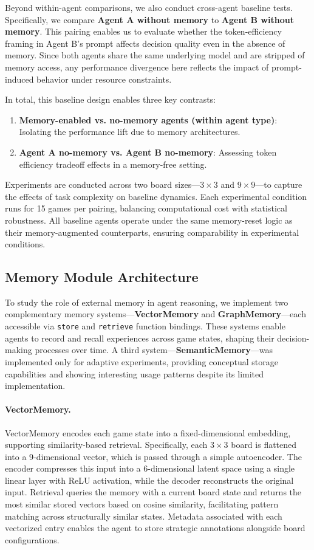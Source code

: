 \documentclass[10pt]{article}
\begin{document}
Beyond within-agent comparisons, we also conduct cross-agent baseline tests. Specifically, we compare \textbf{Agent A without memory} to \textbf{Agent B without memory}. This pairing enables us to evaluate whether the token-efficiency framing in Agent B's prompt affects decision quality even in the absence of memory. Since both agents share the same underlying model and are stripped of memory access, any performance divergence here reflects the impact of prompt-induced behavior under resource constraints.

In total, this baseline design enables three key contrasts:
\begin{enumerate}[leftmargin=*,nosep]
    \item \textbf{Memory-enabled vs. no-memory agents (within agent type)}: Isolating the performance lift due to memory architectures.
    \item \textbf{Agent A no-memory vs. Agent B no-memory}: Assessing token efficiency tradeoff effects in a memory-free setting.
\end{enumerate}

Experiments are conducted across two board sizes—$3 \times 3$ and $9 \times 9$—to capture the effects of task complexity on baseline dynamics. Each experimental condition runs for 15 games per pairing, balancing computational cost with statistical robustness. All baseline agents operate under the same memory-reset logic as their memory-augmented counterparts, ensuring comparability in experimental conditions.

\subsection{Memory Module Architecture}

To study the role of external memory in agent reasoning, we implement two complementary memory systems—\textbf{VectorMemory} and \textbf{GraphMemory}—each accessible via \verb|store| and \verb|retrieve| function bindings. These systems enable agents to record and recall experiences across game states, shaping their decision-making processes over time. A third system—\textbf{SemanticMemory}—was implemented only for adaptive experiments, providing conceptual storage capabilities and showing interesting usage patterns despite its limited implementation.

\paragraph{VectorMemory.} 
VectorMemory encodes each game state into a fixed-dimensional embedding, supporting similarity-based retrieval. Specifically, each $3 \times 3$ board is flattened into a 9-dimensional vector, which is passed through a simple autoencoder. The encoder compresses this input into a 6-dimensional latent space using a single linear layer with ReLU activation, while the decoder reconstructs the original input. Retrieval queries the memory with a current board state and returns the most similar stored vectors based on cosine similarity, facilitating pattern matching across structurally similar states. Metadata associated with each vectorized entry enables the agent to store strategic annotations alongside board configurations.
\end{document}
